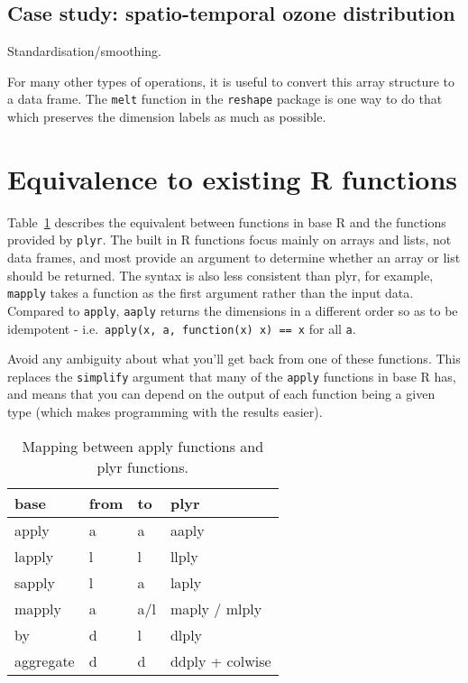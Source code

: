 \documentclass[letterpaper,oneside]{scrartcl}
\begin{document}
\subsection{Case study: spatio-temporal ozone distribution}

Standardisation/smoothing.

For many other types of operations, it is useful to convert this array structure to a data frame.  The {\tt melt} function in the {\tt reshape} package is one way to do that which preserves the dimension labels as much as possible.

\section{Equivalence to existing R functions}
\label{sec:equiv}

Table~\ref{tbl:equiv} describes the equivalent between functions in base R and 
the functions provided by {\tt plyr}.  The built in R functions focus mainly on arrays and lists, not data frames, and most provide an argument to determine whether an array or list should be returned.  The syntax is also less consistent than plyr, for example, {\tt mapply} takes a function as the first argument rather than the input data.  Compared to {\tt apply}, {\tt aaply} returns the dimensions in a different order so as to be idempotent - i.e.\ {\tt apply(x, a, function(x) x) == x} for all {\tt a}. 

Avoid any ambiguity about what you'll get back from one of these functions. This replaces the {\tt simplify} argument that many of the {\tt apply} functions in base R has, and means that you can depend on the output of each function being a given type (which makes programming with the results easier).


\begin{table}[htpb]
  \begin{center}
  \begin{tabular}{llll}
    base & from & to & plyr \\
    \hline
    apply     & a & a   & aaply \\
    lapply    & l & l   & llply \\
    sapply    & l & a   & laply \\
    mapply    & a & a/l & maply / mlply \\
    by        & d & l   & dlply \\
    aggregate & d & d   & ddply + colwise \\
  \end{tabular}
  \end{center}
  \caption{Mapping between apply functions and plyr functions.}
  \label{tbl:equiv}
\end{table}
\end{document}
